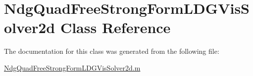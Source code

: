 \hypertarget{class_ndg_quad_free_strong_form_l_d_g_vis_solver2d}{}\section{Ndg\+Quad\+Free\+Strong\+Form\+L\+D\+G\+Vis\+Solver2d Class Reference}
\label{class_ndg_quad_free_strong_form_l_d_g_vis_solver2d}


The documentation for this class was generated from the following file\+:\begin{DoxyCompactItemize}
\item 
\hyperlink{_ndg_quad_free_strong_form_l_d_g_vis_solver2d_8m}{Ndg\+Quad\+Free\+Strong\+Form\+L\+D\+G\+Vis\+Solver2d.\+m}\end{DoxyCompactItemize}
